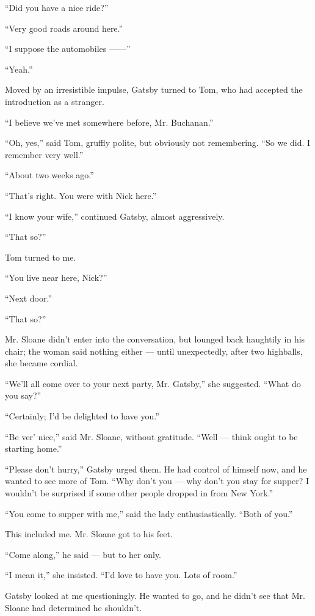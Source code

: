 \documentclass{znotebook}
\begin{document}
``Did you have a nice ride?''

``Very good roads around here.''

``I suppose the automobiles ——''

``Yeah.''

Moved by an irresistible impulse, Gatsby turned to Tom, who had accepted the introduction as a stranger.

``I believe we’ve met somewhere before, Mr. Buchanan.''

``Oh, yes,'' said Tom, gruffly polite, but obviously not remembering. ``So we did. I remember very well.''

``About two weeks ago.''

``That’s right. You were with Nick here.''

``I know your wife,'' continued Gatsby, almost aggressively.

``That so?''

Tom turned to me.

``You live near here, Nick?''

``Next door.''

``That so?''

Mr. Sloane didn’t enter into the conversation, but lounged back haughtily in his chair; the woman said nothing either — until unexpectedly, after two highballs, she became cordial.

``We’ll all come over to your next party, Mr. Gatsby,'' she suggested. ``What do you say?''

``Certainly; I’d be delighted to have you.''

``Be ver’ nice,'' said Mr. Sloane, without gratitude. ``Well — think ought to be starting home.''

``Please don’t hurry,'' Gatsby urged them. He had control of himself now, and he wanted to see more of Tom. ``Why don’t you — why don’t you stay for supper? I wouldn’t be surprised if some other people dropped in from New York.''

``You come to supper with me,'' said the lady enthusiastically. ``Both of you.''

This included me. Mr. Sloane got to his feet.

``Come along,'' he said — but to her only.

``I mean it,'' she insisted. ``I’d love to have you. Lots of room.''

Gatsby looked at me questioningly. He wanted to go, and he didn’t see that Mr. Sloane had determined he shouldn’t.
\end{document}
